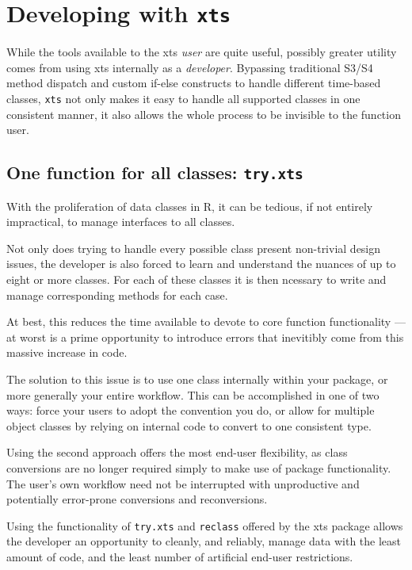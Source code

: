 \documentclass{article}
\begin{document}
\pagebreak
\section{Developing with {\tt xts}}
\label{developer}
While the tools available to the xts \emph{user} are quite
useful, possibly greater utility comes from using xts
internally as a \emph{developer}. Bypassing
traditional S3/S4 method dispatch and
custom if-else constructs to handle different time-based
classes, {\tt xts} not only makes it easy to
handle all supported classes in one consistent manner,
it also allows the whole process to be invisible
to the function user.

\subsection{One function for all classes: {\tt try.xts}}
With the proliferation of data classes in R, it can be
tedious, if not entirely impractical, to manage interfaces to all
classes.

Not only does trying to handle every possible class present
non-trivial design issues, the developer is also forced
to learn and understand the nuances of up to eight or
more classes. For each of these classes it is then
ncessary to write and manage
corresponding methods for each case.

At best, this reduces the time available
to devote to core function functionality --- at worst
is a prime opportunity to introduce errors that
inevitibly come from this massive increase in code.

The solution to this issue is to use one class
internally within your package, or more generally your
entire workflow.  This can
be accomplished in one of two ways: force your users
to adopt the convention you do, or allow for
multiple object classes by relying on internal
code to convert to one consistent type.

Using the second approach offers the most end-user
flexibility, as class conversions are no longer
required simply to make use of package functionality. The
user's own workflow need not be interrupted with unproductive and
potentially error-prone conversions and reconversions.

Using the functionality of {\tt try.xts} and {\tt reclass} offered
by the xts package allows the developer an opportunity
to cleanly, and reliably, manage data with the least amount
of code, and the least number of artificial end-user restrictions.
\end{document}

